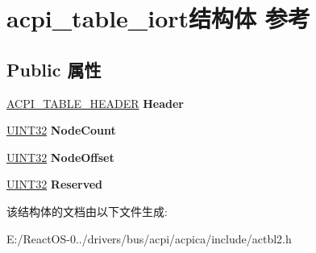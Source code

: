 \hypertarget{structacpi__table__iort}{}\section{acpi\+\_\+table\+\_\+iort结构体 参考}
\label{structacpi__table__iort}
\subsection*{Public 属性}
\begin{DoxyCompactItemize}
\item 
\mbox{\label{structacpi__table__iort_a1b17e1b7073c1eabd54a6fc257905cab}} 
\hyperlink{structacpi__table__header}{A\+C\+P\+I\+\_\+\+T\+A\+B\+L\+E\+\_\+\+H\+E\+A\+D\+ER} {\bfseries Header}
\item 
\mbox{\label{structacpi__table__iort_a75385b23682b72c397cb3dd6ba3337d7}} 
\hyperlink{_processor_bind_8h_ae1e6edbbc26d6fbc71a90190d0266018}{U\+I\+N\+T32} {\bfseries Node\+Count}
\item 
\mbox{\label{structacpi__table__iort_a8c12ad5410772e696915d7a369554521}} 
\hyperlink{_processor_bind_8h_ae1e6edbbc26d6fbc71a90190d0266018}{U\+I\+N\+T32} {\bfseries Node\+Offset}
\item 
\mbox{\label{structacpi__table__iort_a0965747f86a5ecfb89cfff5584bee3a3}} 
\hyperlink{_processor_bind_8h_ae1e6edbbc26d6fbc71a90190d0266018}{U\+I\+N\+T32} {\bfseries Reserved}
\end{DoxyCompactItemize}


该结构体的文档由以下文件生成\+:\begin{DoxyCompactItemize}
\item 
E\+:/\+React\+O\+S-\/0../drivers/bus/acpi/acpica/include/actbl2.\+h\end{DoxyCompactItemize}
